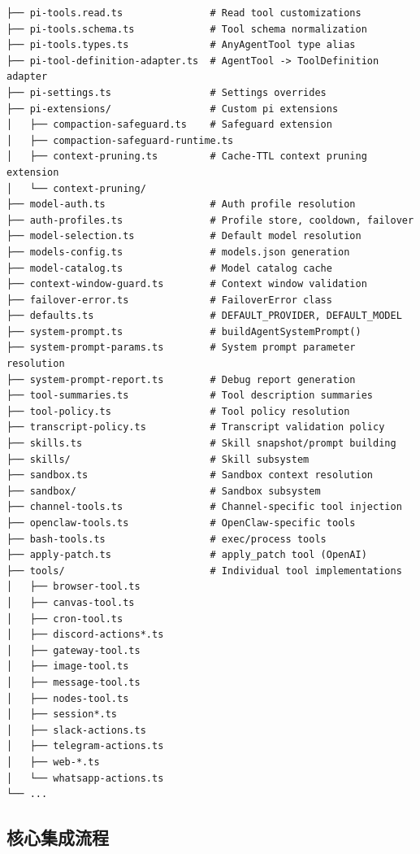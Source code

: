 \begin{lstlisting}
├── pi-tools.read.ts               # Read tool customizations
├── pi-tools.schema.ts             # Tool schema normalization
├── pi-tools.types.ts              # AnyAgentTool type alias
├── pi-tool-definition-adapter.ts  # AgentTool -> ToolDefinition adapter
├── pi-settings.ts                 # Settings overrides
├── pi-extensions/                 # Custom pi extensions
│   ├── compaction-safeguard.ts    # Safeguard extension
│   ├── compaction-safeguard-runtime.ts
│   ├── context-pruning.ts         # Cache-TTL context pruning extension
│   └── context-pruning/
├── model-auth.ts                  # Auth profile resolution
├── auth-profiles.ts               # Profile store, cooldown, failover
├── model-selection.ts             # Default model resolution
├── models-config.ts               # models.json generation
├── model-catalog.ts               # Model catalog cache
├── context-window-guard.ts        # Context window validation
├── failover-error.ts              # FailoverError class
├── defaults.ts                    # DEFAULT_PROVIDER, DEFAULT_MODEL
├── system-prompt.ts               # buildAgentSystemPrompt()
├── system-prompt-params.ts        # System prompt parameter resolution
├── system-prompt-report.ts        # Debug report generation
├── tool-summaries.ts              # Tool description summaries
├── tool-policy.ts                 # Tool policy resolution
├── transcript-policy.ts           # Transcript validation policy
├── skills.ts                      # Skill snapshot/prompt building
├── skills/                        # Skill subsystem
├── sandbox.ts                     # Sandbox context resolution
├── sandbox/                       # Sandbox subsystem
├── channel-tools.ts               # Channel-specific tool injection
├── openclaw-tools.ts              # OpenClaw-specific tools
├── bash-tools.ts                  # exec/process tools
├── apply-patch.ts                 # apply_patch tool (OpenAI)
├── tools/                         # Individual tool implementations
│   ├── browser-tool.ts
│   ├── canvas-tool.ts
│   ├── cron-tool.ts
│   ├── discord-actions*.ts
│   ├── gateway-tool.ts
│   ├── image-tool.ts
│   ├── message-tool.ts
│   ├── nodes-tool.ts
│   ├── session*.ts
│   ├── slack-actions.ts
│   ├── telegram-actions.ts
│   ├── web-*.ts
│   └── whatsapp-actions.ts
└── ...
\end{lstlisting}


\subsection{核心集成流程}


